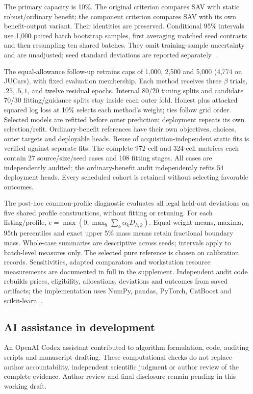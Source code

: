 The primary capacity is 10\%. The original criterion compares SAV with
static robust/ordinary benefit; the component criterion compares SAV with
its own benefit-output variant. Their identities are preserved. Conditional
95\% intervals use 1,000 paired batch bootstrap samples, first averaging
matched seed contrasts and then resampling ten shared batches. They omit
training-sample uncertainty and are unadjusted; seed standard deviations
are reported separately~\cite{efron1979bootstrap,cameron2015clusters}.

The equal-allowance follow-up retrains caps of 1,000, 2,500 and 5,000
(4,774 on JUCars), with fixed evaluation membership. Each method receives
three $\beta$ trials, $.25,.5,1$, and twelve residual epochs. Internal
80/20 tuning splits and candidate 70/30 fitting/guidance splits stay inside
each outer fold. Honest plus attacked squared log loss at 10\% selects
each method's weight; ties follow grid order. Selected models are refitted
before outer prediction; deployment repeats its own selection/refit.
Ordinary-benefit references have their own objectives, choices, outer targets
and deployable heads. Reuse of acquisition-independent static fits is verified
against separate fits. The complete 972-cell and 324-cell matrices each
contain 27 source/size/seed cases and 108 fitting stages. All cases are
independently audited; the ordinary-benefit audit independently refits 54
deployment heads. Every scheduled cohort is retained without selecting
favorable outcomes.

The post-hoc common-profile diagnostic evaluates all legal held-out deviations
on five shared profile constructions, without fitting or retuning. For each
listing/profile, $e=\max(0,\max_h\sum_k\alpha_kD_{h,k})$. Equal-weight means,
maxima, 95th percentiles and exact upper 5\% mass means retain fractional
boundary mass. Whole-case summaries are descriptive across seeds; intervals
apply to batch-level measures only. The selected pure reference is chosen
on calibration records. Sensitivities, adapted comparators and workstation
resource measurements are documented in full in the supplement. Independent
audit code rebuilds prices, eligibility, allocations, deviations and outcomes
from saved artifacts; the implementation uses NumPy, pandas, PyTorch,
CatBoost and scikit-learn~\cite{pedregosa2011sklearn}.

\subsection{AI assistance in development}
An OpenAI Codex assistant contributed to algorithm formulation, code, auditing
scripts and manuscript drafting. These computational checks do not replace
author accountability, independent scientific judgment or author review of
the complete evidence. Author review and final disclosure remain pending in
this working draft.
